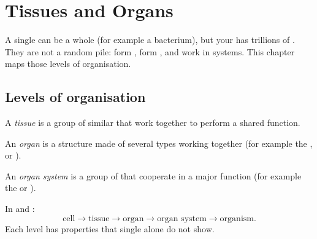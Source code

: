 \chapter{Tissues and Organs}\label{ch:g7:tissues}

A single  can be a whole  (for example a bacterium), but your
 has trillions of . They are not a random pile:  form
,  form , and  work in systems. This chapter
maps those levels of organisation.

\section{Levels of organisation}

\begin{definition}[Tissue]\label{def:g7:tissues:tissue}
A \emph{tissue} is a group of similar  that work
together to perform a shared function.
\end{definition}

\begin{definition}[Organ]\label{def:g7:tissues:organ}
An \emph{organ} is a structure made of several  types
working together (for example the ,  or ).
\end{definition}

\begin{definition}\label{def:g7:tissues:system}
An \emph{organ system} is a group of  that
cooperate in a major  function (for example the  or
).
\end{definition}

\begin{proposition}[Hierarchy]\label{prop:g7:tissues:hierarchy}
In   and :
\[
\text{cell} \to \text{tissue} \to \text{organ} \to \text{organ system}
\to \text{organism}.
\]
Each level has properties that single  alone do not show.
\end{proposition}
\admitted

